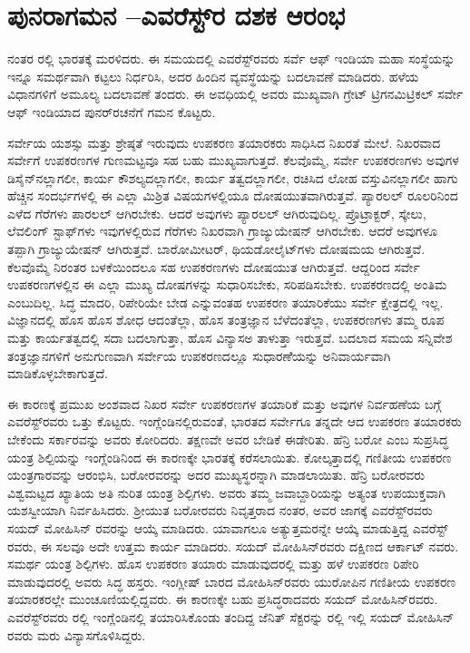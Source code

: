 
\chapter{ಪುನರಾಗಮನ –ಎವರೆಸ್ಟ್​ರ ದಶಕ ಆರಂಭ}

ನಂತರ ರಲ್ಲಿ ಭಾರತಕ್ಕೆ ಮರಳಿದರು. ಈ ಸಮಯದಲ್ಲಿ ಎವರೆಸ್ಟ್​ರವರು ಸರ್ವೆ ಆಫ್​ ಇಂಡಿಯಾ ಮಹಾ ಸಂಸ್ಥೆಯನ್ನು ಇನ್ನೂ ಸಮರ್ಥವಾಗಿ ಕಟ್ಟಲು ನಿರ್ಧರಿಸಿ, ಅದರ ಹಿಂದಿನ ವ್ಯವಸ್ಥೆಯನ್ನು ಬದಲಾವಣೆ ಮಾಡಿದರು. ಹಳೆಯ ವಿಧಾನಗಳಿಗೆ ಅಮೂಲ್ಯ ಬದಲಾವಣೆ ತಂದರು. ಈ ಅವಧಿಯಲ್ಲಿ ಅವರು ಮುಖ್ಯವಾಗಿ ಗ್ರೇಟ್​ ಟ್ರಿಗನಮಿಟ್ರಿಕಲ್​ ಸರ್ವೇ ಆಫ್​ ಇಂಡಿಯಾದ ಪುನರ್​ರಚನೆಗೆ ಗಮನ ಕೊಟ್ಟರು.

ಸರ್ವೇಯ ಯಶಸ್ಸು ಮತ್ತು ಶ್ರೇಷ್ಠತೆ ಇರುವುದು ಉಪಕರಣ ತಯಾರಕರು ಸಾಧಿಸಿದ ನಿಖರತೆ ಮೇಲೆ. ನಿಖರವಾದ ಸರ್ವೇಗೆ ಉಪಕರಣಗಳ ಗುಣಮಟ್ಟವೂ ಸಹ ಬಹು ಮುಖ್ಯವಾಗುತ್ತದೆ. ಕೆಲವೊಮ್ಮೆ, ಸರ್ವೇ ಉಪಕರಣಗಳು ಅವುಗಳ ಡಿಸೈನ್​ನಲ್ಲಾಗಲೀ, ಕಾರ್ಯ ಕೌಶಲ್ಯದಲ್ಲಾಗಲೀ, ಕಾರ್ಯ ತತ್ವದಲ್ಲಾಗಲೀ, ರಚಿಸಿದ ಲೋಹ ವಸ್ತುವಿನಲ್ಲಾಗಲೀ ಹಾಗು ಹೆಚ್ಚಿನ ಸಂದರ್ಭಗಳಲ್ಲಿ ಈ ಎಲ್ಲಾ ಮಿಶ್ರಿತ ವಿಷಯಗಳಲ್ಲಿಯೂ ದೋಷಯುತವಾಗಿರುತ್ತವೆ. ಪ್ಯಾರಲಲ್​ ರೂಲರಿನಿಂದ ಎಳೆದ ಗೆರೆಗಳು ಪಾರಲಲ್​ ಆಗಿರಬೇಕು. ಆದರೆ ಅವುಗಳು ಪ್ಯಾರಲಲ್​ ಆಗಿರುವುದಿಲ್ಲ. ಪ್ರೊಟ್ರಾಕ್ಟರ್​, ಸ್ಕೇಲು, ಲೆವಲಿಂಗ್​ ಸ್ಟಾಫ್​ಗಳು ಇವುಗಳಲ್ಲಿರುವ ಗೆರೆಗಳು ನಿಖರವಾಗಿ ಗ್ರಾಜ್ಯುಯೇಷನ್​ ಆಗಿರಬೇಕು. ಆದರೆ ಅವುಗಳೂ ತಪ್ಪಾಗಿ ಗ್ರಾಜ್ಯುಯೇಷನ್​ ಆಗಿರುತ್ತವೆ. ಬಾರೋಮೀಟರ್​, ಥಿಯಡೋಲೈಟ್​ಗಳು ದೋಷಮಯ ಆಗಿರುತ್ತವೆ. ಕೆಲವೊಮ್ಮೆ ನಿರಂತರ ಬಳಕೆಯಿಂದಲೂ ಸಹ ಉಪಕರಣಗಳು ದೋಷಯುತ ಆಗಿರುತ್ತವೆ. ಆದ್ದರಿಂದ ಸರ್ವೇ ಉಪಕರಣಗಳಲ್ಲಿನ ಈ ಎಲ್ಲಾ ಮುಖ್ಯ ದೋಷಗಳನ್ನು ಸುಧಾರಿಸಬೇಕು, ಸರಿಪಡಿಸಬೇಕು. ಉಪಕರಣದಲ್ಲಿ ಅಂತಿಮ ಎಂಬುದಿಲ್ಲ. ಸಿದ್ಧ ಮಾದರಿ, ರಿಪೇರಿಯೇ ಬೇಡ ಎನ್ನುವಂತಹ ಉಪಕರಣ ತಯಾರಿಕೆಯು ಸರ್ವೇ ಕ್ಷೇತ್ರದಲ್ಲಿ ಇಲ್ಲ. ವಿಜ್ಞಾನದಲ್ಲಿ ಹೊಸ ಹೊಸ ಶೋಧ ಆದಂತೆಲ್ಲಾ, ಹೊಸ ತಂತ್ರಜ್ಞಾನ ಬೆಳೆದಂತೆಲ್ಲಾ, ಉಪಕರಣಗಳು ತಮ್ಮ ರೂಪ ಮತ್ತು ಕಾರ್ಯತತ್ವದಲ್ಲಿ ಸದಾ ಬದಲಾಗುತ್ತಾ, ಹೊಸ ವಿನ್ಯಾಸಅ ತಾಳುತ್ತಾ ಇರುತ್ತವೆ. ಬದಲಾದ ಸಮಯ ಸನ್ನಿವೇಶ ತಂತ್ರಜ್ಞಾನಗಳಿಗೆ ಅನುಗುಣವಾಗಿ ಸರ್ವೇಯ ಉಪಕರಣದಲ್ಲೂ ಸುಧಾರಣೆೆಯನ್ನು ಅನಿವಾರ್ಯವಾಗಿ ಮಾಡಿಕೊಳ್ಳಬೇಕಾಗುತ್ತದೆ.

ಈ ಕಾರಣಕ್ಕೆ ಪ್ರಮುಖ ಅಂಶವಾದ ನಿಖರ ಸರ್ವೇ ಉಪಕರಣಗಳ ತಯಾರಿಕೆ ಮತ್ತು ಅವುಗಳ ನಿರ್ವಹಣೆಯ ಬಗ್ಗೆ ಎವರೆಸ್ಟ್​ರವರು ಒತ್ತು ಕೊಟ್ಟರು. ಇಂಗ್ಲೆಂಡಿನಲ್ಲಿರುವಂತೆ, ಭಾರತದ ಸರ್ವೇಗೂ ತನ್ನದೇ ಆದ ಉಪಕರಣ ತಯಾರಕರು ಬೇಕೆಂದು ಸರ್ಕಾರವನ್ನು ಅವರು ಕೋರಿದರು. ತಕ್ಷಣವೇ ಅವರ ಬೇಡಿಕೆ ಈಡೇರಿತು. ಹೆನ್ರಿ ಬರೋ ಎಂಬ ಸುಪ್ರಸಿದ್ಧ ಯಂತ್ರ ಶಿಲ್ಪಿಯನ್ನು ಇಂಗ್ಲೆಂಡಿನಿಂದ ಈ ಕಾರಣಕ್ಕೇ ಭಾರತಕ್ಕೆ ಕರೆಸಲಾಯಿತು. ಕೋಲ್ಕತ್ತಾದಲ್ಲಿ ಗಣಿತೀಯ ಉಪಕರಣ ಯಂತ್ರಗಾರವನ್ನು ಆರಂಭಿಸಿ, ಬರೋರವರನ್ನು ಅದರ ಮುಖ್ಯಸ್ಥರನ್ನಾಗಿ ಮಾಡಲಾಯಿತು. ಹೆನ್ರಿ ಬರೋರವರು ವಿಶ್ವಮಟ್ಟದ ಖ್ಯಾತಿಯ ಅತಿ ನುರಿತ ಯಂತ್ರ ಶಿಲ್ಪಿಗಳು. ಅವರು ತಮ್ಮ ಜವಾಬ್ದಾರಿಯನ್ನು ಅತ್ಯಂತ ಉಪಯುಕ್ತವಾಗಿ ಯಶಸ್ವೀಯಾಗಿ ನಿರ್ವಹಿಸಿದರು. ಶ‍್ರೀಯುತ ಬರೋರವರು ನಿವೃತ್ತರಾದ ನಂತರ, ಅವರ ಜಾಗಕ್ಕೆ ಎವರೆಸ್ಟ್​ರವರು ಸಯದ್​ ಮೋಹಿಸಿನ್​ ರವರನ್ನು ಆಯ್ಕೆ ಮಾಡಿದರು. ಯಾವಾಗಲೂ ಅತ್ಯುತ್ತಮರನ್ನೇ ಆಯ್ಕೆ ಮಾಡುತ್ತಿದ್ದ ಎವರೆಸ್ಟ್​ರವರು, ಈ ಸಲವೂ ಅದೇ ಉತ್ತಮ ಕಾರ್ಯ ಮಾಡಿದರು. ಸಯದ್​ ಮೋಹಿಸಿನ್​ರವರು ದಕ್ಷಿಣದ ಆರ್ಕಾಟ್​ ನವರು. ಸಮರ್ಥ ಯಂತ್ರ ಶಿಲ್ಪಿಗಳು. ಹೊಸ ಉಪಕರಣ ತಯಾರು ಮಾಡುವುದರಲ್ಲಿ ಮತ್ತು ಹಳೆ ಉಪಕರಣ ರಿಪೇರಿ ಮಾಡುವುದರಲ್ಲಿ ಅವರು ಸಿದ್ಧ ಹಸ್ತರು. ಇಂಗ್ಲೀಷ್​ ಬಾರದ ಮೋಹಿಸಿನ್​ರವರು ಯುರೋಪಿನ ಗಣಿತೀಯ ಉಪಕರಣ ತಯಾರಕರಲ್ಲೇ ಮುಂಚೂಣಿಯಲ್ಲಿದ್ದವರು. ಈ ಕಾರಣಕ್ಕೇ ಬಹು ಪ್ರಸಿದ್ಧರಾದವರು ಸಯದ್​ ಮೋಹಿಸಿನ್​ರವರು. ಎವರೆಸ್ಟ್​ ರವರು ರಲ್ಲಿ ಇಂಗ್ಲೆಂಡಿನಲ್ಲಿ ತಯಾರಿಸಿಕೊಂಡು ತಂದಿದ್ದ ಜೆನಿತ್​ ಸೆಕ್ಟರನ್ನು  ರಲ್ಲಿ ಇಲ್ಲಿ ಸಯದ್​ ಮೋಹಿಸಿನ್​ರವರು ಮರು ವಿನ್ಯಾಸಗೊಳಿಸಿದ್ದರು.

